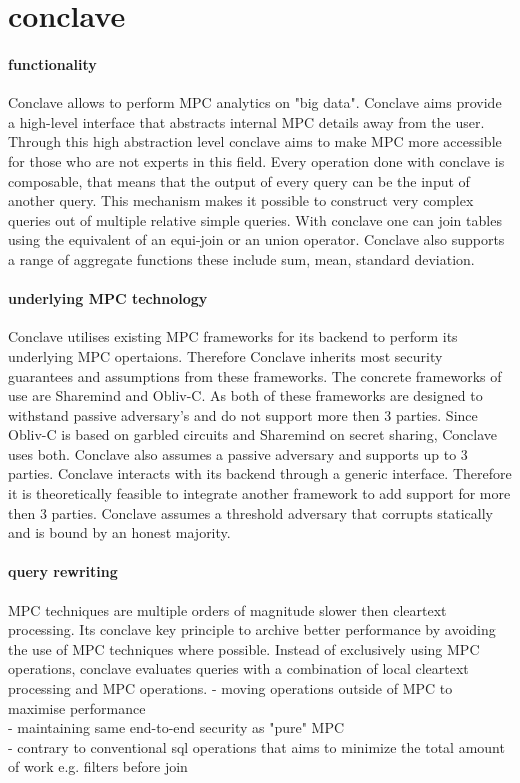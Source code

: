 \section{conclave}


\paragraph {functionality}
Conclave allows to perform MPC analytics on "big data". Conclave aims provide a high-level interface that abstracts internal MPC details away from the user. Through this high abstraction level conclave aims to make MPC more accessible for those who are not experts in this field.  Every operation done with conclave is composable, that means that the output of every query can be the input of another query. This mechanism makes it possible to construct very complex queries out of multiple relative simple queries.  With conclave one can join tables using the equivalent of an equi-join or an union operator. Conclave also supports a range of aggregate functions these include sum, mean, standard deviation. 

\paragraph{underlying MPC technology}
Conclave utilises existing MPC frameworks for its backend to perform its underlying MPC opertaions. Therefore Conclave inherits most security guarantees and assumptions from these frameworks. The concrete frameworks of use are Sharemind and Obliv-C. As both of these frameworks are designed to withstand passive adversary's and do not support more then 3 parties. Since Obliv-C is based on garbled circuits and Sharemind on secret sharing, Conclave uses both. Conclave also assumes a passive adversary and supports up to 3 parties. Conclave interacts with its backend through a generic interface. Therefore it is theoretically feasible to integrate another framework to add support for more then 3 parties. Conclave assumes a threshold adversary that corrupts statically and is bound by an honest majority.

\paragraph{query rewriting}
MPC techniques are multiple orders of magnitude slower then cleartext processing. Its conclave key principle to archive better performance by avoiding the use of MPC techniques where possible. Instead of exclusively using MPC operations, conclave evaluates queries with a combination of local cleartext processing and MPC operations. 
- moving operations outside of MPC to maximise performance\\
- maintaining same end-to-end security as "pure" MPC     \\
- contrary to conventional sql operations that aims to minimize the total amount of work e.g. filters before join \\


